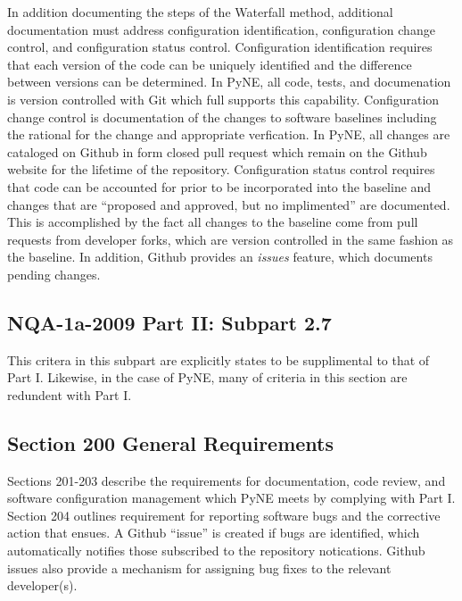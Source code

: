 \documentclass{anstrans}
\begin{document}
In addition documenting the steps of the Waterfall method, additional
documentation must address configuration identification, configuration change
control, and configuration status control. Configuration identification
requires that each version of the code can be uniquely identified and the
difference between versions can be determined. In PyNE, all code, tests, and
documenation is version controlled with Git which full supports this
capability. Configuration change control is documentation of the changes to
software baselines including the rational for the change and appropriate
verfication. In PyNE, all changes are cataloged on Github in form closed pull
request which remain on the Github website for the lifetime of the repository.
Configuration status control requires that code can be accounted for prior to
be incorporated into the baseline and changes that are ``proposed and approved,
but no implimented'' are documented. This is accomplished by the fact all
changes to the baseline come from pull requests from developer forks, which are
version controlled in the same fashion as the baseline. In addition, Github
provides an \emph{issues} feature, which documents pending changes.


\subsection{NQA-1a-2009 Part II: Subpart 2.7}

This critera in this subpart are explicitly states to be supplimental to that
of Part I. Likewise, in the case of PyNE, many of criteria in this section are
redundent with Part I.

\subsection{Section 200 General Requirements}

Sections 201-203 describe the requirements for documentation, code review, and
software configuration management which PyNE meets by complying with Part I.
Section 204 outlines requirement for reporting software bugs and the corrective
action that ensues. A Github ``issue'' is created if bugs are identified, which
automatically notifies those subscribed to the repository notications. Github
issues also provide a mechanism for assigning bug fixes to the relevant
developer(s). 

\end{document}
